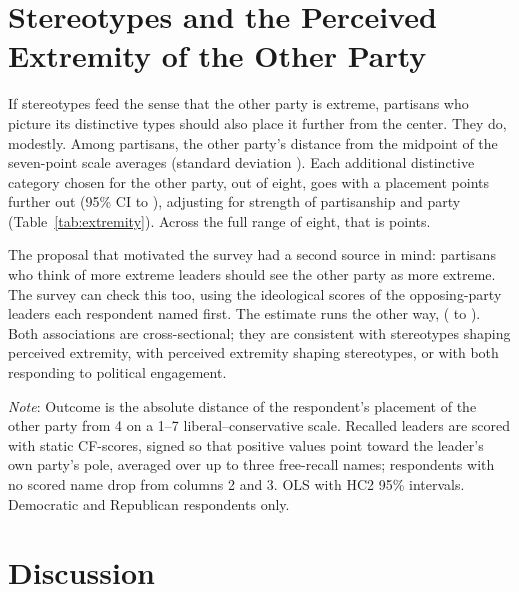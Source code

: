 \documentclass[11pt]{article}
\newcommand{\TableStyle}{\small\setlength{\tabcolsep}{5pt}\renewcommand{\arraystretch}{1.05}}
\begin{document}
\section{Stereotypes and the Perceived Extremity of the Other Party}

If stereotypes feed the sense that the other party is extreme, partisans who picture its distinctive types should also place it further from the center. They do, modestly. Among \extN{} partisans, the other party's distance from the midpoint of the seven-point scale averages \extMean{} (standard deviation \extSd). Each additional distinctive category chosen for the other party, out of eight, goes with a placement \extStereo{} points further out (95\% CI \extStereoLo{} to \extStereoHi), adjusting for strength of partisanship and party (Table~\ref{tab:extremity}). Across the full range of eight, that is \extStereoRange{} points.

The proposal that motivated the survey had a second source in mind: partisans who think of more extreme leaders should see the other party as more extreme. The survey can check this too, using the ideological scores of the opposing-party leaders each respondent named first. The estimate runs the other way, \extRecall{} (\extRecallLo{} to \extRecallHi). Both associations are cross-sectional; they are consistent with stereotypes shaping perceived extremity, with perceived extremity shaping stereotypes, or with both responding to political engagement.

\begin{table}[htbp]
\centering\TableStyle
\caption{Perceived extremity of the other party, regressed on stereotyped guesses and the leaders recalled.}
\label{tab:extremity}
\begin{minipage}{\linewidth}\footnotesize\vspace{4pt}
\emph{Note}: Outcome is the absolute distance of the respondent's placement of the other party from 4 on a 1--7 liberal--conservative scale. Recalled leaders are scored with static CF-scores, signed so that positive values point toward the leader's own party's pole, averaged over up to three free-recall names; respondents with no scored name drop from columns 2 and 3. OLS with HC2 95\% intervals. Democratic and Republican respondents only.
\end{minipage}
\end{table}

\section{Discussion}
\end{document}
